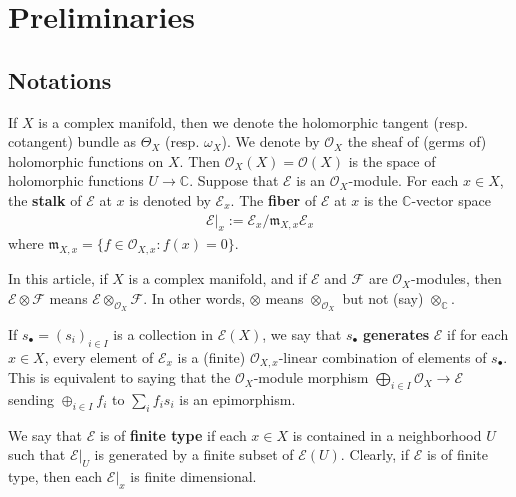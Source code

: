 \documentclass[11pt,b5paper,notitlepage]{article}
\theoremstyle{definition}
\theoremstyle{plain}
\newcommand{\mc}{\mathcal}
\newcommand{\scr}{\mathscr}
\newcommand{\blt}{\bullet}
\newcommand{\Cbb}{\mathbb C}
\newcommand{\<}{\left\langle}
\renewcommand{\>}{\right\rangle}
\newcommand{\mk}{\mathfrak m}
\numberwithin{equation}{subsection}
\begin{document}



\section{Preliminaries}

\subsection{Notations}

If $X$ is a complex manifold, then we denote the holomorphic tangent (resp. cotangent) bundle as $\Theta_X$ (resp. $\omega_X$). We denote by $\mc O_X$ the sheaf of (germs of) holomorphic functions on $X$. Then $\mc O_X(X)=\mc O(X)$ is the space of holomorphic functions $U\rightarrow\Cbb$. Suppose that $\scr E$ is an $\mc O_X$-module. For each $x\in X$, the \textbf{stalk} of $\scr E$ at $x$ is denoted by $\scr E_x$. The \textbf{fiber} of $\scr E$ at $x$ is the $\Cbb$-vector space
\begin{align}
\scr E|_x:=\scr E_x/\mk_{X,x}\scr E_x
\end{align}  
where $\mk_{X,x}=\{f\in\mc O_{X,x}:f(x)=0\}$. 


In this article, if $X$ is a complex manifold, and if $\scr E$ and $\scr F$ are $\mc O_X$-modules, then $\scr E\otimes\scr F$ means $\scr E\otimes_{\mc O_X}\scr F$. In other words, $\otimes$ means $\otimes_{\mc O_X}$ but not (say) $\otimes_\Cbb$.

If $s_\blt=(s_i)_{i\in I}$ is a collection in $\scr E(X)$, we say that $s_\blt$ \textbf{generates} $\scr E$ if for each $x\in X$, every element of $\scr E_x$ is a (finite) $\mc O_{X,x}$-linear combination of elements of $s_\blt$. This is equivalent to saying that the $\mc O_X$-module morphism $\bigoplus_{i\in I}\mc O_X\rightarrow \scr E$ sending $\oplus_{i\in I}f_i$ to $\sum_i f_is_i$ is an epimorphism.

We say that $\scr E$ is of \textbf{finite type} if each $x\in X$ is contained in a neighborhood $U$ such that $\scr E|_U$ is generated by a finite subset of $\scr E(U)$. Clearly, if $\scr E$ is of finite type, then each $\scr E|_x$ is finite dimensional.
\end{document}

